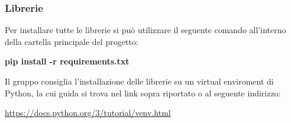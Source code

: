 \subsubsection{Librerie}
\label{sec:Librerie}
Per installare tutte le librerie si può utilizzare il seguente comando all'interno della cartella principale del progetto:\newline{}
\centerline{\textbf{pip install -r requirements.txt}}
Il gruppo consiglia l'installazione delle librerie su un virtual enviroment di Python, la cui guida si trova nel link sopra riportato o al seguente indirizzo:
\newline{}\centerline{\url{https://docs.python.org/3/tutorial/venv.html}}
